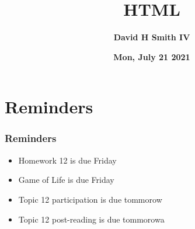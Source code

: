 \documentclass{beamer}
\title{\textbf{HTML}}
\author{\textbf{David H Smith IV}}
\institute[\textbf{UIUC}]{\textbf{University of Illinois Urbana-Champaign}}
\date{\textbf{Mon, July 21 2021}}
\begin{document}
\frame{\titlepage}

\section{Reminders}

%
%
\begin{frame}
    \frametitle{Reminders}
    \begin{itemize}
        \item Homework 12 is due Friday
        \item Game of Life is due Friday
        \item Topic 12 participation is due tommorow
        \item Topic 12 post-reading is due tommorowa
    \end{itemize}
\end{frame}
\end{document}
